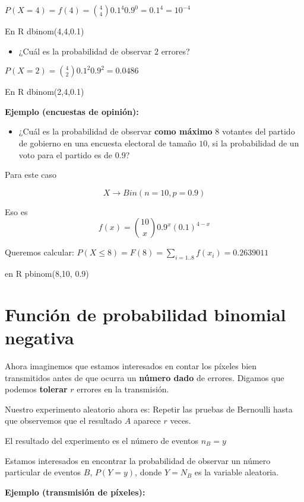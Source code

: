 \documentclass[
]{book}
\providecommand{\tightlist}{%
  \setlength{\itemsep}{0pt}\setlength{\parskip}{0pt}}
\begin{document}
\(P(X=4)=f(4)=\binom 4 4 0.1^4 0.9^{0}=0.1^4=10^{-4}\)

En R dbinom(4,4,0.1)

\begin{itemize}
\tightlist
\item
  ¿Cuál es la probabilidad de observar \(2\) errores?
\end{itemize}

\(P(X=2)=\binom 4 2 0.1^2 0.9^2=0.0486\)

En R dbinom(2,4,0.1)

\textbf{Ejemplo (encuestas de opinión):}

\begin{itemize}
\tightlist
\item
  ¿Cuál es la probabilidad de observar \textbf{como máximo} \(8\) votantes del partido de gobierno en una encuesta electoral de tamaño \(10\), si la probabilidad de un voto para el partido es de \(0.9\)?
\end{itemize}

Para este caso

\[X \rightarrow Bin(n=10, p=0.9)\]

Eso es \[f(x)=\binom {10} x 0.9^x(0.1)^{4-x}\]

Queremos calcular:
\(P(X\le 8)=F(8)= \sum_{i=1..8} f(x_i)=0.2639011\)

en R pbinom(8,10, 0.9)

\hypertarget{funciuxf3n-de-probabilidad-binomial-negativa}{%
\section{Función de probabilidad binomial negativa}\label{funciuxf3n-de-probabilidad-binomial-negativa}}

Ahora imaginemos que estamos interesados en contar los píxeles bien transmitidos antes de que ocurra un \textbf{número dado} de errores. Digamos que podemos \textbf{tolerar} \(r\) errores en la transmisión.

Nuestro experimento aleatorio ahora es: Repetir las pruebas de Bernoulli hasta que observemos que el resultado \(A\) aparece \(r\) veces.

El resultado del experimento es el número de eventos \(n_B=y\)

Estamos interesados en encontrar la probabilidad de observar un número particular de eventos \(B\), \(P(Y=y)\), donde \(Y=N_B\) es la variable aleatoria.

\textbf{Ejemplo (transmisión de píxeles):}
\end{document}
